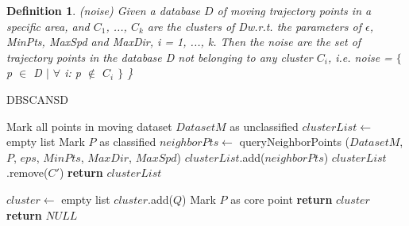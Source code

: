 \documentclass[12pt,glossary]{dalcsthesis}
\newtheorem{definition}{Definition}
\begin{document}
\begin{definition}
\label{def:noise}
(noise)
Given a database $D$ of moving trajectory points in a specific area, and $C_1$, ..., $C_k$ are the clusters of Dw.r.t. the parameters of $\epsilon$, MinPts, MaxSpd and MaxDir, i = 1, ..., k. Then the noise are the set of trajectory points in the database D not belonging to any cluster $C_i$, i.e. noise = $\{$ p $\in$ D $\mid$ $\forall$ i: p $\notin$ $C_i$ $\}$
\}
\end{definition}


\renewcommand{\algorithmicrequire}{\textbf{Input:}}
\renewcommand{\algorithmicensure}{\textbf{Output:}}


\begin{algorithm}
\caption{DBSCANSD}\label{algo1}
\begin{algorithmic}[1]
\State  Mark all points in moving dataset $DatasetM$ as unclassified
\State $clusterList \gets$ empty list
    \State Mark $P$ as classified
    \State $neighborPts \gets$ queryNeighborPoints ($DatasetM$, $P$, $eps$, $MinPts$, $MaxDir$, $MaxSpd$)
        \State  $clusterList$.add($neighborPts$)
    \EndIf
\EndFor
{}
                             
                \State $clusterList$.remove($C'$)
            \EndIf
        \EndIf
    \EndFor
\EndFor
\State \textbf{return} $clusterList$
\EndProcedure

\State $cluster \gets$ empty list 
                \State $cluster$.add($Q$)
            \EndIf
        \EndIf
    \EndIf
\EndFor
{}
    \State Mark $P$ as core point
    \State \textbf{return} $cluster$
\EndIf
\State \textbf{return} $NULL$
\EndProcedure
{}

\end{algorithmic}
\end{algorithm}
\end{document}
